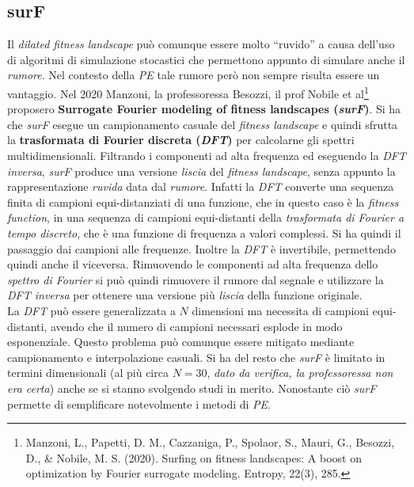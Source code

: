 \documentclass[a4paper,12pt, oneside]{book}
\begin{document}
\subsection{surF}
Il \textit{dilated fitness landscape} può comunque essere molto ``ruvido'' a
causa dell'uso di algoritmi di simulazione stocastici che permettono appunto di
simulare anche il \textit{rumore}. Nel contesto della \textit{PE} tale rumore
però non sempre risulta essere un vantaggio. Nel 2020 Manzoni, la professoressa
Besozzi, il prof Nobile et al\footnote{Manzoni, L., Papetti, D. M., Cazzaniga,
  P., Spolaor, S., Mauri, G., Besozzi, D., \& Nobile, M. S. (2020). Surfing on
  fitness landscapes: A boost on optimization by Fourier surrogate
  modeling. Entropy, 22(3), 285.} proposero \textbf{Surrogate Fourier modeling
  of fitness landscapes (\textit{surF})}. Si ha che \textit{surF} esegue un
campionamento casuale del \textit{fitness landscape} e quindi sfrutta la
\textbf{trasformata 
di Fourier discreta (\textit{DFT})} per calcolarne gli spettri
multidimensionali. Filtrando i componenti ad alta frequenza ed eseguendo la
\textit{DFT inversa}, \textit{surF} produce una versione \textit{liscia} del
\textit{fitness landscape}, senza appunto la rappresentazione \textit{ruvida}
data dal \textit{rumore}. Infatti la \textit{DFT} converte una sequenza finita
di campioni equi-distanziati di una funzione, che in questo caso è la
\textit{fitness function}, in una sequenza di campioni equi-distanti della
\textit{trasformata di Fourier a tempo discreto}, che è una funzione di
frequenza a valori complessi. Si ha quindi il passaggio dai campioni alle
frequenze. Inoltre la \textit{DFT} è invertibile, permettendo quindi anche il
viceversa. Rimuovendo le componenti ad alta frequenza dello \textit{spettro di
  Fourier} si può quindi rimuovere il rumore dal segnale e utilizzare la
\textit{DFT inversa} per ottenere una versione più \textit{liscia} della
funzione originale. \\
La \textit{DFT} può essere generalizzata a $N$ dimensioni ma necessita di
campioni 
equi-distanti, avendo che il numero di campioni necessari esplode in modo
esponenziale. Questo problema può comunque essere mitigato mediante
campionamento e interpolazione casuali. Si ha del resto che \textit{surF} è
limitato in termini dimensionali (al più circa $N=30$, \textit{dato da verifica,
la professoressa non era certa}) anche se si stanno svolgendo studi in
merito. Nonostante ciò \textit{surF} permette di semplificare notevolmente i
metodi di \textit{PE}.
\end{document}
